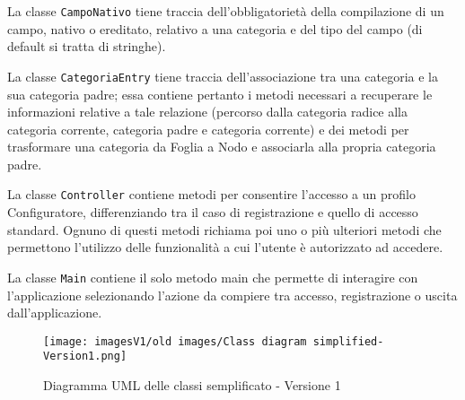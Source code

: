 La classe \texttt{CampoNativo} tiene traccia dell'obbligatorietà della compilazione di un campo, nativo o ereditato, relativo a una categoria e del tipo del campo (di default si tratta di stringhe). 

La classe \texttt{CategoriaEntry} tiene traccia dell'associazione tra una categoria e la sua categoria padre; essa contiene pertanto i metodi necessari a recuperare le informazioni relative a tale relazione (percorso dalla categoria radice alla categoria corrente, categoria padre e categoria corrente) e dei metodi per trasformare una categoria da Foglia a Nodo e associarla alla propria categoria padre.

La classe \texttt{Controller} contiene metodi per consentire l'accesso a un profilo Configuratore, differenziando tra il caso di registrazione e quello di accesso standard. Ognuno di questi metodi richiama poi uno o più ulteriori metodi che permettono l'utilizzo delle funzionalità a cui l'utente è autorizzato ad accedere.

La classe \texttt{Main} contiene il solo metodo main che permette di interagire con l'applicazione selezionando l'azione da compiere tra accesso, registrazione o uscita dall'applicazione.

\begin{figure}[!]
    \centering
    \texttt{[image: imagesV1/old images/Class diagram simplified-Version1.png]}
    \caption{\label{fig:Simplified Class Diagram - v1}Diagramma UML delle classi semplificato - Versione 1}
\end{figure}